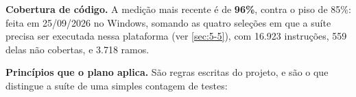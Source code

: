 
\textbf{Cobertura de código.} A medição mais recente é de \textbf{96\%}, contra o piso de 85\%: feita em 25/09/2026 no Windows, somando as quatro seleções em que a suíte precisa ser executada nessa plataforma (ver \ref{sec:5-5}), com 16.923 instruções, 559 delas não cobertas, e 3.718 ramos.


\textbf{Princípios que o plano aplica.} São regras escritas do projeto, e são o que distingue a suíte de uma simples contagem de testes:

